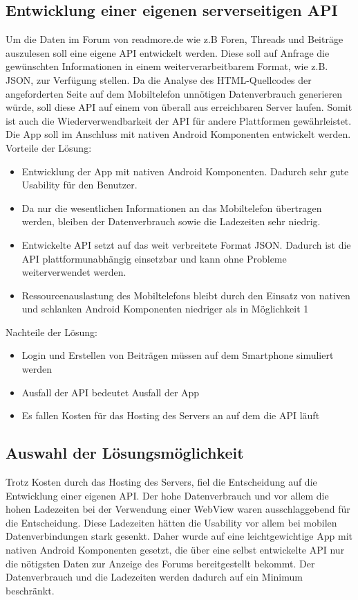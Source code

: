 \subsection{Entwicklung einer eigenen serverseitigen API}
Um die Daten im Forum von readmore.de wie z.B Foren, Threads und Beiträge
auszulesen soll eine eigene API entwickelt werden. Diese soll auf Anfrage die
gewünschten Informationen in einem weiterverarbeitbarem Format, wie z.B. JSON,
zur Verfügung stellen. Da die Analyse des HTML-Quellcodes der angeforderten
Seite auf dem Mobiltelefon unnötigen Datenverbrauch generieren würde, soll diese
API auf einem von überall aus erreichbaren Server laufen. Somit ist auch die
Wiederverwendbarkeit der API für andere Plattformen gewährleistet. Die App
soll im Anschluss mit nativen Android Komponenten entwickelt werden. \\
Vorteile der Lösung:
\begin{itemize}
  \item Entwicklung der App mit nativen Android Komponenten. Dadurch sehr gute
  Usability für den Benutzer.
  \item Da nur die wesentlichen Informationen an das Mobiltelefon übertragen
  werden, bleiben der Datenverbrauch sowie die Ladezeiten sehr niedrig.
  \item Entwickelte API setzt auf das weit verbreitete Format JSON. Dadurch ist
  die API plattformunabhängig einsetzbar und kann ohne Probleme weiterverwendet
  werden.
  \item Ressourcenauslastung des Mobiltelefons bleibt durch den Einsatz von
  nativen und schlanken Android Komponenten niedriger als in Möglichkeit 1
\end{itemize}
Nachteile der Lösung:
\begin{itemize}
  \item Login und Erstellen von Beiträgen müssen auf dem Smartphone simuliert
  werden
  \item Ausfall der API bedeutet Ausfall der App
  \item Es fallen Kosten für das Hosting des Servers an auf dem die API läuft
\end{itemize}
\subsection{Auswahl der Lösungsmöglichkeit}
Trotz Kosten durch das Hosting des Servers, fiel die Entscheidung auf die
Entwicklung einer eigenen API. Der hohe Datenverbrauch und vor allem die hohen
Ladezeiten bei der Verwendung einer WebView waren ausschlaggebend für die
Entscheidung. Diese Ladezeiten hätten die Usability vor allem bei mobilen
Datenverbindungen stark gesenkt. Daher wurde auf eine leichtgewichtige App mit
nativen Android Komponenten gesetzt, die über eine selbst entwickelte API nur
die nötigsten Daten zur Anzeige des Forums bereitgestellt bekommt. Der
Datenverbrauch und die Ladezeiten werden dadurch auf ein Minimum beschränkt.
